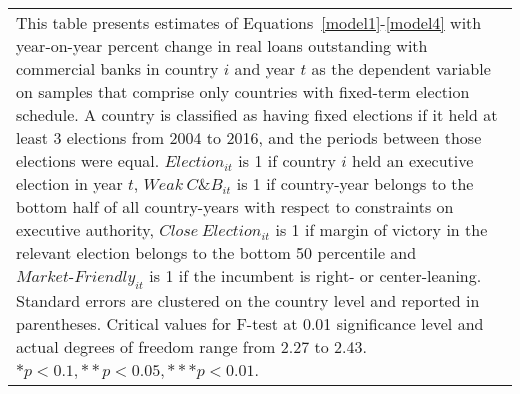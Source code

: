 \begin{longtable}{m{4.5cm}*{12}{c}}
\bottomrule                                          \multicolumn{13}{m{\linewidth}}{\footnotesize This table presents estimates of Equations~\eqref{model1}-\eqref{model4} with year-on-year percent change in real loans outstanding with commercial banks in country $ i $ and year $ t $ as the dependent variable on samples that comprise only countries with fixed-term election schedule. A country is classified as having fixed elections if it held at least 3 elections from 2004 to 2016, and the periods between those elections were equal. $ Election_{it} $ is 1 if country $ i $ held an executive election in year $ t $, $ Weak\ C\&B_{it} $ is 1 if country-year belongs to the bottom half of all country-years with respect to constraints on executive authority, $ Close\ Election_{it} $ is 1 if margin of victory in the relevant election belongs to the bottom 50 percentile and  $ Market\text{-}Friendly_{it} $ is 1 if the incumbent is right- or center-leaning. Standard errors are clustered on the country level and reported in parentheses. Critical values for F-test at 0.01 significance level and actual degrees of freedom range from 2.27 to 2.43. \( * p<0.1, ** p<0.05, *** p<0.01 \). }\\                                          \end{longtable}
